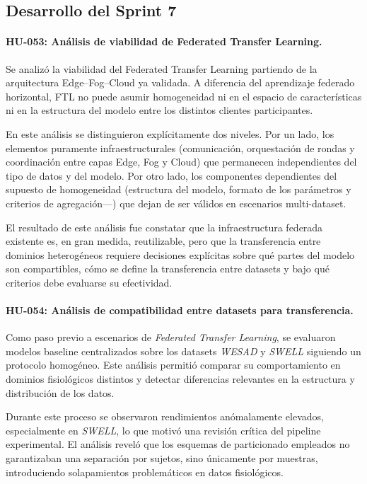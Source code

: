\documentclass{report}
\begin{document}
\subsection{Desarrollo del Sprint 7}

\vspace{0.15em}
\paragraph{HU-053: Análisis de viabilidad de Federated Transfer Learning.}
Se analizó la viabilidad del Federated Transfer Learning partiendo de la arquitectura Edge--Fog--Cloud ya validada. A diferencia del aprendizaje federado horizontal, FTL no puede asumir homogeneidad ni en el espacio de características ni en la estructura del modelo entre los distintos clientes participantes.

En este análisis se distinguieron explícitamente dos niveles. Por un lado, los elementos puramente infraestructurales (comunicación, orquestación de rondas y coordinación entre capas Edge, Fog y Cloud) que permanecen independientes del tipo de datos y del modelo. Por otro lado, los componentes dependientes del supuesto de homogeneidad (estructura del modelo, formato de los parámetros y criterios de agregación—) que dejan de ser válidos en escenarios multi-dataset.

El resultado de este análisis fue constatar que la infraestructura federada existente es, en gran medida, reutilizable, pero que la transferencia entre dominios heterogéneos requiere decisiones explícitas sobre qué partes del modelo son compartibles, cómo se define la transferencia entre datasets y bajo qué criterios debe evaluarse su efectividad.

\vspace{0.15em}
\paragraph{HU-054: Análisis de compatibilidad entre datasets para transferencia.}

Como paso previo a escenarios de \textit{Federated Transfer Learning}, se evaluaron modelos baseline centralizados sobre los datasets \textit{WESAD} y \textit{SWELL} siguiendo un protocolo homogéneo. Este análisis permitió comparar su comportamiento en dominios fisiológicos distintos y detectar diferencias relevantes en la estructura y distribución de los datos.

Durante este proceso se observaron rendimientos anómalamente elevados, especialmente en \textit{SWELL}, lo que motivó una revisión crítica del pipeline experimental. El análisis reveló que los esquemas de particionado empleados no garantizaban una separación por sujetos, sino únicamente por muestras, introduciendo solapamientos problemáticos en datos fisiológicos.
\end{document}
